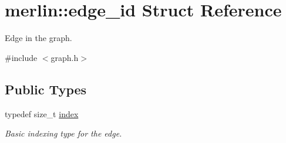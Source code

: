 \hypertarget{structmerlin_1_1edge__id}{}\section{merlin\+:\+:edge\+\_\+id Struct Reference}
\label{structmerlin_1_1edge__id}


Edge in the graph.  




{\ttfamily \#include $<$graph.\+h$>$}

\subsection*{Public Types}
\begin{DoxyCompactItemize}
\item 
\hypertarget{structmerlin_1_1edge__id_af57e3c1f2c2c3194d96468a5f0e7cce0}{}typedef size\+\_\+t \hyperlink{structmerlin_1_1edge__id_af57e3c1f2c2c3194d96468a5f0e7cce0}{index}\label{structmerlin_1_1edge__id_af57e3c1f2c2c3194d96468a5f0e7cce0}

\begin{DoxyCompactList}\small\item\em Basic indexing type for the edge. \end{DoxyCompactList}\end{DoxyCompactItemize}
